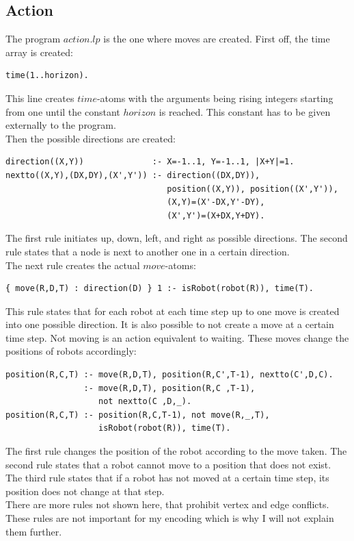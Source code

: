 \documentclass[runningheads]{llncs}
\begin{document}
\subsection{Action}
The program $action.lp$ is the one where moves are created. First off, the time array is created:
\begin{verbatim}
time(1..horizon).
\end{verbatim}
This line creates $time$-atoms with the arguments being rising integers starting from one until the constant $horizon$ is reached. This constant has to be given externally to the program.  \\
Then the possible directions are created:
\begin{verbatim}
direction((X,Y))              :- X=-1..1, Y=-1..1, |X+Y|=1.
nextto((X,Y),(DX,DY),(X',Y')) :- direction((DX,DY)), 
                                 position((X,Y)), position((X',Y')), 
                                 (X,Y)=(X'-DX,Y'-DY), 
                                 (X',Y')=(X+DX,Y+DY).
\end{verbatim}
The first rule initiates up, down, left, and right as possible directions. The second rule states that a node is next to another one in a certain direction. \\
The next rule creates the actual $move$-atoms:
\begin{verbatim}
{ move(R,D,T) : direction(D) } 1 :- isRobot(robot(R)), time(T).
\end{verbatim}
This rule states that for each robot at each time step up to one move is created into one possible direction. It is also possible to not create a move at a certain time step. Not moving is an action equivalent to waiting. These moves change the positions of robots accordingly:
\begin{verbatim}
position(R,C,T) :- move(R,D,T), position(R,C',T-1), nextto(C',D,C).
                :- move(R,D,T), position(R,C ,T-1), 
                   not nextto(C ,D,_).
position(R,C,T) :- position(R,C,T-1), not move(R,_,T), 
                   isRobot(robot(R)), time(T).
\end{verbatim}
The first rule changes the position of the robot according to the move taken. The second rule states that a robot cannot move to a position that does not exist. The third rule states that if a robot has not moved at a certain time step, its position does not change at that step. \\
There are more rules not shown here, that prohibit vertex and edge conflicts. These rules are not important for my encoding which is why I will not explain them further. 
\end{document}

